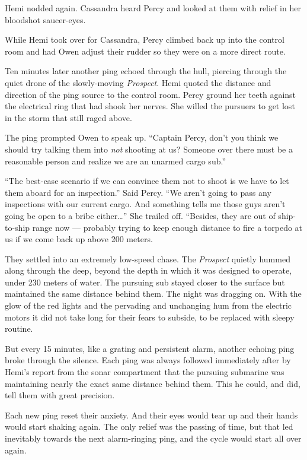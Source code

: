 \documentclass[
]{scrbook}
\begin{document}
Hemi nodded again. Cassandra heard Percy and looked at them with relief
in her bloodshot saucer-eyes.

While Hemi took over for Cassandra, Percy climbed back up into the
control room and had Owen adjust their rudder so they were on a more
direct route.

Ten minutes later another ping echoed through the hull, piercing through
the quiet drone of the slowly-moving \emph{Prospect}. Hemi quoted the
distance and direction of the ping source to the control room. Percy
ground her teeth against the electrical ring that had shook her nerves.
She willed the pursuers to get lost in the storm that still raged above.

The ping prompted Owen to speak up. ``Captain Percy, don't you think we
should try talking them into \emph{not} shooting at us? Someone over
there must be a reasonable person and realize we are an unarmed cargo
sub.''

``The best-case scenario if we can convince them not to shoot is we have
to let them aboard for an inspection.'' Said Percy. ``We aren't going to
pass any inspections with our current cargo. And something tells me
those guys aren't going be open to a bribe either\ldots{}'' She trailed
off. ``Besides, they are out of ship-to-ship range now --- probably
trying to keep enough distance to fire a torpedo at us if we come back
up above 200 meters.

They settled into an extremely low-speed chase. The \emph{Prospect}
quietly hummed along through the deep, beyond the depth in which it was
designed to operate, under 230 meters of water. The pursuing sub stayed
closer to the surface but maintained the same distance behind them. The
night was dragging on. With the glow of the red lights and the pervading
and unchanging hum from the electric motors it did not take long for
their fears to subside, to be replaced with sleepy routine.

But every 15 minutes, like a grating and persistent alarm, another
echoing ping broke through the silence. Each ping was always followed
immediately after by Hemi's report from the sonar compartment that the
pursuing submarine was maintaining nearly the exact same distance behind
them. This he could, and did, tell them with great precision.

Each new ping reset their anxiety. And their eyes would tear up and
their hands would start shaking again. The only relief was the passing
of time, but that led inevitably towards the next alarm-ringing ping,
and the cycle would start all over again.
\end{document}
